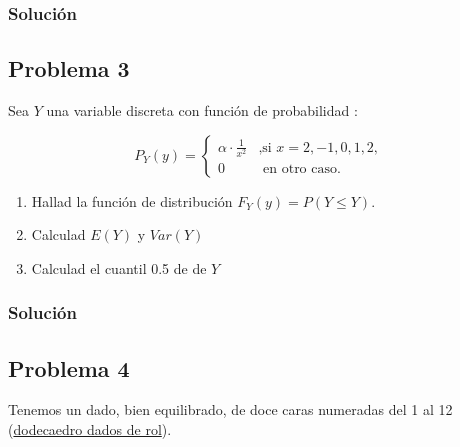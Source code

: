 \documentclass[
]{article}
\providecommand{\tightlist}{%
  \setlength{\itemsep}{0pt}\setlength{\parskip}{0pt}}
\begin{document}
\hypertarget{soluciuxf3n-1}{%
\subsubsection{Solución}\label{soluciuxf3n-1}}

\hypertarget{problema-3}{%
\subsection{Problema 3}\label{problema-3}}

Sea \(Y\) una variable discreta con función de probabilidad :

\[
P_Y(y)=
\left\{\begin{array}{ll}
\alpha\cdot\frac{1}{x^2} & \mbox{,si } x=2,-1,0,1,2,
 \\
0 & \mbox{ en otro caso}.
\end{array}\right. 
\]

\begin{enumerate}
\def\labelenumi{\arabic{enumi}.}
\tightlist
\item
  Hallad la función de distribución \(F_Y(y)=P(Y\leq Y)\).
\item
  Calculad \(E(Y)\) y \(Var(Y)\)
\item
  Calculad el cuantil 0.5 de de \(Y\)
\end{enumerate}

\hypertarget{soluciuxf3n-2}{%
\subsubsection{Solución}\label{soluciuxf3n-2}}

\hypertarget{problema-4}{%
\subsection{Problema 4}\label{problema-4}}

Tenemos un dado, bien equilibrado, de doce caras numeradas del 1 al 12
(\href{https://es.wikipedia.org/wiki/Dados_de_rol}{dodecaedro dados de
rol}).
\end{document}
